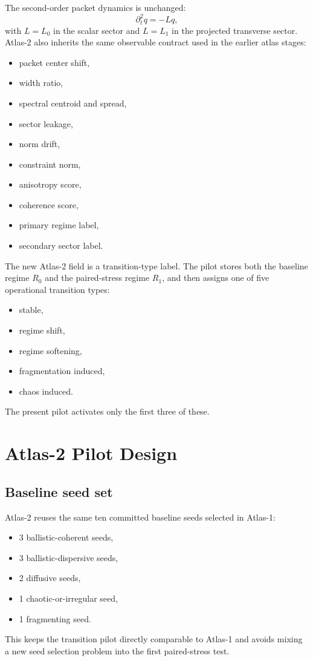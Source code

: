 \documentclass[11pt]{article}
\begin{document}
The second-order packet dynamics is unchanged:
\begin{equation}
\partial_t^2 q = -L q,
\end{equation}
with $L=L_0$ in the scalar sector and $L=L_1$ in the projected transverse sector. Atlas-2 also inherits the same observable contract used in the earlier atlas stages:
\begin{itemize}
\item packet center shift,
\item width ratio,
\item spectral centroid and spread,
\item sector leakage,
\item norm drift,
\item constraint norm,
\item anisotropy score,
\item coherence score,
\item primary regime label,
\item secondary sector label.
\end{itemize}

The new Atlas-2 field is a transition-type label. The pilot stores both the baseline regime $R_0$ and the paired-stress regime $R_1$, and then assigns one of five operational transition types:
\begin{itemize}
\item stable,
\item regime shift,
\item regime softening,
\item fragmentation induced,
\item chaos induced.
\end{itemize}
The present pilot activates only the first three of these.

\section{Atlas-2 Pilot Design}
\subsection{Baseline seed set}
Atlas-2 reuses the same ten committed baseline seeds selected in Atlas-1:
\begin{itemize}
\item 3 ballistic-coherent seeds,
\item 3 ballistic-dispersive seeds,
\item 2 diffusive seeds,
\item 1 chaotic-or-irregular seed,
\item 1 fragmenting seed.
\end{itemize}
This keeps the transition pilot directly comparable to Atlas-1 and avoids mixing a new seed selection problem into the first paired-stress test.
\end{document}
